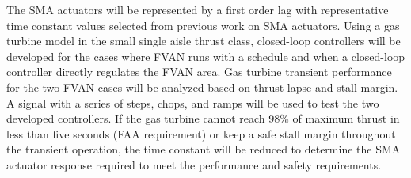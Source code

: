 The SMA actuators will be represented by a first order lag with representative time constant values selected from previous work on SMA actuators.  Using a gas turbine model in the small single aisle thrust class, closed-loop controllers will be developed for the cases where FVAN runs with a schedule and when a closed-loop controller directly regulates the FVAN area. Gas turbine transient performance for the two FVAN cases will be analyzed based on thrust lapse and stall margin. A signal with a series of steps, chops, and ramps will be used to test the two developed controllers. If the gas turbine cannot reach 98\% of maximum thrust in less than five seconds (FAA requirement) or keep a safe stall margin throughout the transient operation, the time constant will be reduced to determine the SMA actuator response required to meet the performance and safety requirements.
